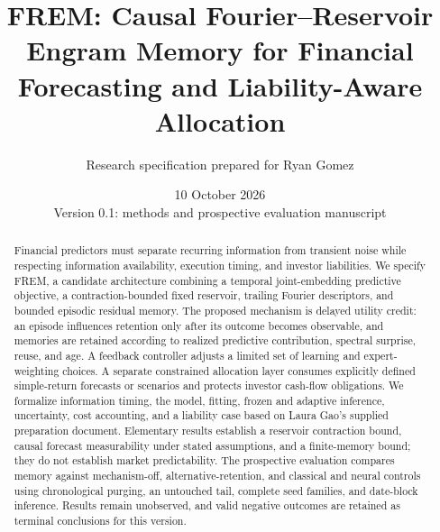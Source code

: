 \documentclass[11pt,a4paper]{article}
\title{FREM: Causal Fourier--Reservoir Engram Memory for Financial Forecasting and Liability-Aware Allocation}
\author{Research specification prepared for Ryan Gomez}
\date{10 October 2026\\Version 0.1: methods and prospective evaluation manuscript}
\begin{document}
\maketitle
\begin{center}
\end{center}

\begin{abstract}
Financial predictors must separate recurring information from transient noise while respecting information availability, execution timing, and investor liabilities. We specify FREM, a candidate architecture combining a temporal joint-embedding predictive objective, a contraction-bounded fixed reservoir, trailing Fourier descriptors, and bounded episodic residual memory. The proposed mechanism is delayed utility credit: an episode influences retention only after its outcome becomes observable, and memories are retained according to realized predictive contribution, spectral surprise, reuse, and age. A feedback controller adjusts a limited set of learning and expert-weighting choices. A separate constrained allocation layer consumes explicitly defined simple-return forecasts or scenarios and protects investor cash-flow obligations. We formalize information timing, the model, fitting, frozen and adaptive inference, uncertainty, cost accounting, and a liability case based on Laura Gao's supplied preparation document. Elementary results establish a reservoir contraction bound, causal forecast measurability under stated assumptions, and a finite-memory bound; they do not establish market predictability. The prospective evaluation compares memory against mechanism-off, alternative-retention, and classical and neural controls using chronological purging, an untouched tail, complete seed families, and date-block inference. Results remain unobserved, and valid negative outcomes are retained as terminal conclusions for this version.
\end{abstract}
\newpage
\begingroup
\small
\setlength{\parskip}{0pt}
\tableofcontents
\endgroup
\newpage
\end{document}
